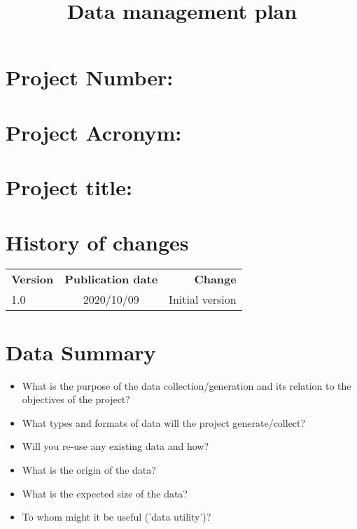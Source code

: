 \documentclass{article}
\title{Data management plan}
\author{}
\date{}
\begin{document}
\begin{titlepage}
\maketitle
\bigskip
\section*{Project  Number:}
\section*{Project Acronym:}
\section*{Project title:}
\bigskip
\section*{History of changes}
\begin{tabular}{ l | c | r }
   \textbf{Version} & \textbf{Publication date} & \textbf{Change} \\
   1.0 & 2020/10/09 & Initial version \\
\end{tabular}
\end{titlepage}

\newpage
\tableofcontents
\newpage

\section{Data Summary}
\begin{itemize}
\item What is the purpose of the data collection/generation and its relation to the objectives of the project?
\item What types and formats of data will the project generate/collect?
\item Will you re-use any existing data and how?
\item What is the origin of the data?
\item What is the expected size of the data?
\item To whom might it be useful ('data utility')?
\end{itemize}
\end{document}
